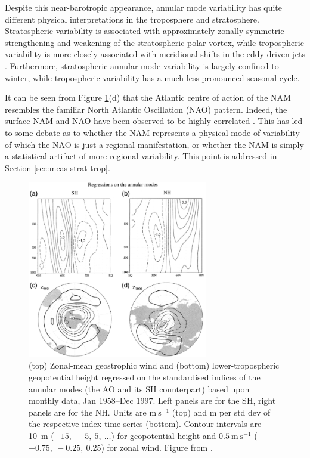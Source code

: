 Despite this near-barotropic appearance, annular mode variability has quite
different physical interpretations in the troposphere and
stratosphere. Stratospheric variability is associated with approximately zonally
symmetric strengthening and weakening of the stratospheric polar vortex, while
tropospheric variability is more closely associated with meridional shifts in
the eddy-driven jets \citep{Limpasuvan1999}. Furthermore, stratospheric annular
mode variability is largely confined to winter, while tropospheric variability
has a much less pronounced seasonal cycle.

It can be seen from Figure \ref{fig:annular_modes}(d) that the Atlantic centre
of action of the NAM resembles the familiar North Atlantic Oscillation (NAO)
pattern. Indeed, the surface NAM and NAO have been observed to be highly
correlated \citep{Ambaum2001}. This has led to some debate as to whether the NAM
represents a physical mode of variability of which the NAO is just a regional
manifestation, or whether the NAM is simply a statistical artifact of more
regional variability. This point is addressed in Section
\ref{sec:meas-strat-trop}.

\begin{figure}
 \centering
 \noindent\includegraphics[width=0.7\textwidth]{figures/chapter-intro/annular_modes_TW2.png}
 \caption[Annular mode patterns from \citet{Thompson2000a}]{(top) Zonal-mean
   geostrophic wind and (bottom) lower-tropospheric geopotential height
   regressed on the standardised indices of the annular modes (the AO and its SH
   counterpart) based upon monthly data, Jan 1958--Dec 1997. Left panels are for
   the SH, right panels are for the NH. Units are $\mathrm{m~s^{-1}}$ (top) and
   m per std dev of the respective index time series (bottom). Contour intervals
   are 10~m ($-15,~-5,~5,~\dots$) for geopotential height and
   $\mathrm{0.5~m~s^{-1}}$ ($-0.75,~-0.25,~0.25$) for zonal wind. Figure from
   \citet{Thompson2000a}.}
 \label{fig:annular_modes}
\end{figure}


